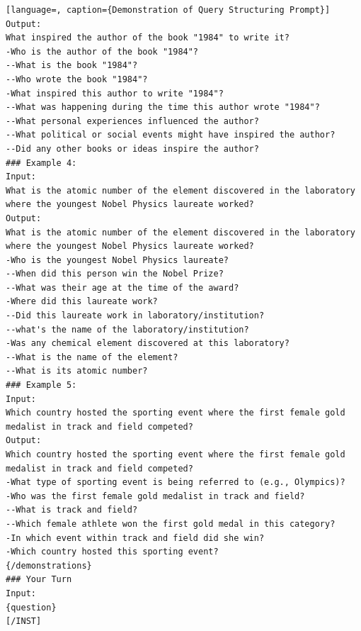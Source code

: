 \documentclass[11pt]{article}
\begin{document}
\begin{lstlisting}[language=, caption={Demonstration of Query Structuring Prompt}]
Output:
What inspired the author of the book "1984" to write it?
-Who is the author of the book "1984"?
--What is the book "1984"?
--Who wrote the book "1984"?
-What inspired this author to write "1984"?
--What was happening during the time this author wrote "1984"?
--What personal experiences influenced the author?
--What political or social events might have inspired the author?
--Did any other books or ideas inspire the author?
### Example 4:
Input:
What is the atomic number of the element discovered in the laboratory where the youngest Nobel Physics laureate worked?
Output:
What is the atomic number of the element discovered in the laboratory where the youngest Nobel Physics laureate worked?
-Who is the youngest Nobel Physics laureate?
--When did this person win the Nobel Prize?
--What was their age at the time of the award?
-Where did this laureate work?
--Did this laureate work in laboratory/institution?
--what's the name of the laboratory/institution?
-Was any chemical element discovered at this laboratory?
--What is the name of the element?
--What is its atomic number?
### Example 5:
Input:
Which country hosted the sporting event where the first female gold medalist in track and field competed?
Output:
Which country hosted the sporting event where the first female gold medalist in track and field competed?
-What type of sporting event is being referred to (e.g., Olympics)?
-Who was the first female gold medalist in track and field?
--What is track and field?
--Which female athlete won the first gold medal in this category?
-In which event within track and field did she win?
-Which country hosted this sporting event?
{/demonstrations}
### Your Turn
Input:
{question}
[/INST]
\end{lstlisting}
\label{Query Structuring Prompt}
\end{document}
